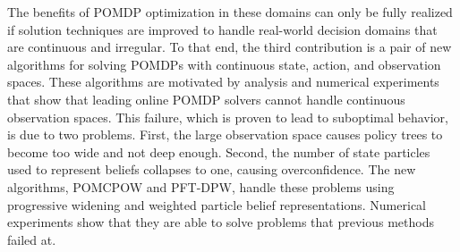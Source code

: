 \documentclass[12pt]{report}
\begin{document}
The benefits of POMDP optimization in these domains can only be fully realized if solution techniques are improved to handle real-world decision domains that are continuous and irregular.
To that end, the third contribution is a pair of new algorithms for solving POMDPs with continuous state, action, and observation spaces.
These algorithms are motivated by analysis and numerical experiments that show that leading online POMDP solvers cannot handle continuous observation spaces.
This failure, which is proven to lead to suboptimal behavior, is due to two problems.
First, the large observation space causes policy trees to become too wide and not deep enough.
Second, the number of state particles used to represent beliefs collapses to one, causing overconfidence.
The new algorithms, POMCPOW and PFT-DPW, handle these problems using progressive widening and weighted particle belief representations.
Numerical experiments show that they are able to solve problems that previous methods failed at.



% 


% 




% 
% 
% 
% 


% 
% 
% 
% 


% 
% 
% 
\end{document}
